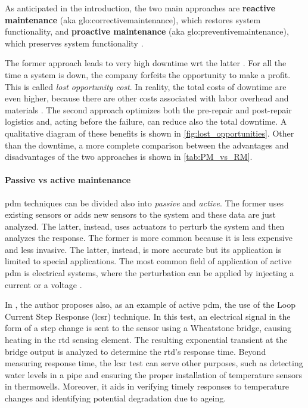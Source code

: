 As anticipated in the introduction, the two main approaches are \textbf{reactive maintenance} (\gls{aka} \gls{glo:correctivemaintenance}), which restores system functionality, and \textbf{proactive maintenance} (\gls{aka} \gls{glo:preventivemaintenance}), which preserves system functionality \cite{Rely_maint_book}.

The former approach leads to very high downtime \gls{wrt} the latter \cite{NIST}. For all the time a system is down, the company forfeits the opportunity to make a profit. This is called \emph{lost opportunity cost}. In reality, the total costs of downtime are even higher, because there are other costs associated with labor overhead and materials \cite{Lost_Opport_Cost}. The second approach optimizes both the pre-repair and post-repair logistics and, acting before the failure, can reduce also the total downtime. A qualitative diagram of these benefits is shown in \autoref{fig:lost_opportunities}. Other than the downtime, a more complete comparison between the advantages and disadvantages of the two approaches is shown in \autoref{tab:PM_vs_RM}.



\paragraph{Passive vs active maintenance}
\gls{pdm} techniques can be divided also into \emph{passive} and \emph{active}. The former uses existing sensors or adds new sensors to the system and these data are just analyzed. The latter, instead, uses actuators to perturb the system and then analyzes the response. The former is more common because it is less expensive and less invasive. The latter, instead, is more accurate but its application is limited to special applications. The most common field of application of active \gls{pdm} is electrical systems, where the perturbation can be applied by injecting a current or a voltage \cite{State_Art_Hasemian_2011}.

In \cite{State_Art_Hasemian_2011}, the author proposes also, as an example of active \gls{pdm}, the use of the Loop Current Step Response (\gls{lcsr}) technique. In this test, an electrical signal in the form of a step change is sent to the sensor using a Wheatstone bridge, causing heating in the \gls{rtd} sensing element. The resulting exponential transient at the bridge output is analyzed to determine the \gls{rtd}'s response time. Beyond measuring response time, the \gls{lcsr} test can serve other purposes, such as detecting water levels in a pipe and ensuring the proper installation of temperature sensors in thermowells. Moreover, it aids in verifying timely responses to temperature changes and identifying potential degradation due to ageing.

